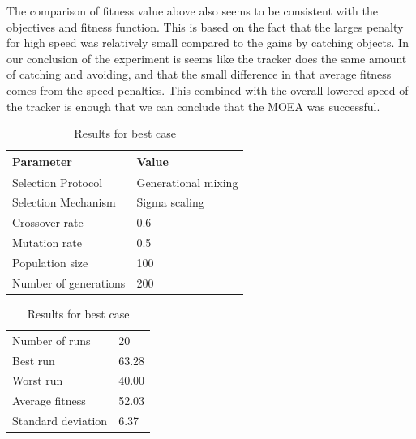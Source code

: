 \documentclass[12pt]{article}
\begin{document}
		The comparison of fitness value above also seems to be consistent with the objectives and fitness function. This is based on the fact that the larges penalty for high speed was relatively small compared to the gains by catching objects. In our conclusion of the experiment is seems like the tracker does the same amount of catching and avoiding, and that the small difference in that average fitness comes from the speed penalties. This combined with the overall lowered speed of the tracker is enough that we can conclude that the MOEA was successful.
		\begin{table}[h]
				\parbox{.45\linewidth}{
					\centering
					\begin{tabular}{ll}
						Parameter & Value\\\hline
						Selection Protocol & Generational mixing\\
						Selection Mechanism & Sigma scaling\\
						Crossover rate & 0.6\\
						Mutation rate & 0.5\\
						Population size & 100\\
						Number of generations & 200
					\end{tabular}
					\caption{Parameters used to obtain best average case}
					\label{tab:resultAvoidmoea}
				}
				\hfill
				\parbox{.45\linewidth}{
					\centering
					\begin{tabular}{ll}
						Number of runs & 20 \\
						Best run & 63.28\\
						Worst run & 40.00\\
						\hline
						Average fitness & 52.03\\
						Standard deviation & 6.37\\
					\end{tabular}
					\caption{Results for best case}
					\label{tab:resultAvoidmoea}
				}
			\end{table}
\end{document}

